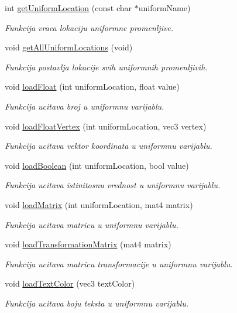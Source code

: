 \begin{DoxyCompactItemize}
int \hyperlink{classshader_1_1FontShader_aa1ac58dc94c17fdf26121e8967ef87fd}{get\+Uniform\+Location} (const char $\ast$uniform\+Name)
\begin{DoxyCompactList}\small\item\em Funkcija vraca lokaciju uniformne promenljive. \end{DoxyCompactList}\item 
void \hyperlink{classshader_1_1FontShader_a89c2e19fdbe971db4c7bdc72effd2043}{get\+All\+Uniform\+Locations} (void)
\begin{DoxyCompactList}\small\item\em Funkcija postavlja lokacije svih uniformnih promenljivih. \end{DoxyCompactList}\item 
void \hyperlink{classshader_1_1FontShader_a34039484ee1b1f2b4799aa08d81da019}{load\+Float} (int uniform\+Location, float value)
\begin{DoxyCompactList}\small\item\em Funkcija ucitava broj u uniformnu varijablu. \end{DoxyCompactList}\item 
void \hyperlink{classshader_1_1FontShader_a18c2405ae1e1bdf5ff417d5bba7febdf}{load\+Float\+Vertex} (int uniform\+Location, vec3 vertex)
\begin{DoxyCompactList}\small\item\em Funkcija ucitava vektor koordinata u uniformnu varijablu. \end{DoxyCompactList}\item 
void \hyperlink{classshader_1_1FontShader_a4415b7e9a5f22561c9d10100c3d7b71e}{load\+Boolean} (int uniform\+Location, bool value)
\begin{DoxyCompactList}\small\item\em Funkcija ucitava istinitosnu vrednost u uniformnu varijablu. \end{DoxyCompactList}\item 
void \hyperlink{classshader_1_1FontShader_a28f790307f575713dba18aeef06b904e}{load\+Matrix} (int uniform\+Location, mat4 matrix)
\begin{DoxyCompactList}\small\item\em Funkcija ucitava matricu u uniformnu varijablu. \end{DoxyCompactList}\item 
void \hyperlink{classshader_1_1FontShader_a050d93154a3baabd8a61344670f76a9d}{load\+Transformation\+Matrix} (mat4 matrix)
\begin{DoxyCompactList}\small\item\em Funkcija ucitava matricu transformacije u uniformnu varijablu. \end{DoxyCompactList}\item 
void \hyperlink{classshader_1_1FontShader_a51f55279667df9c2661909a0bfbcdebe}{load\+Text\+Color} (vec3 text\+Color)
\begin{DoxyCompactList}\small\item\em Funkcija ucitava boju teksta u uniformnu varijablu. \end{DoxyCompactList}\end{DoxyCompactItemize}
